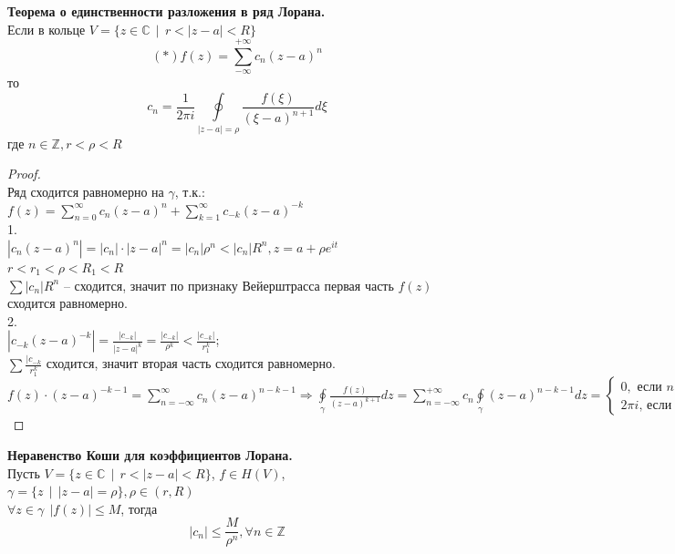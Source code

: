 \textbf{Теорема о единственности разложения в ряд Лорана.}\\[2mm]
Если в кольце $V = \{z\in\mathbb{C} ~~|~~ r < |z - a| < R\}$
$$
(*) f(z) = \sum\limits_{-\infty}^{+\infty}c_n(z - a)^n
$$
то
$$
c_n = \frac{1}{2\pi i}\oint\limits_{|z - a| = \rho} \frac{f(\xi)}{(\xi - a)^{n + 1}} d\xi
$$
где $n\in\mathbb{Z}, r < \rho < R$

\begin{proof}
    \ \\
    Ряд сходится равномерно на $\gamma$, т.к.:\\
    $f(z)=\sum_{n=0}^\infty c_n(z-a)^n + \sum_{k=1}^\infty c_{-k}(z-a)^{-k}$\\
    1.\\
    $|c_n(z-a)^n|=|c_n|\cdot|z-a|^n=|c_n|\rho^n < |c_n|R^n, z=a+\rho e^{it}$\\
    $r<r_1<\rho<R_1<R$\\
    $\sum|c_n|R^n$ -- сходится, значит по признаку Вейерштрасса первая часть  $f(z)$ сходится равномерно.\\
    2.\\
    $|c_{-k}(z-a)^{-k}|=\frac{|c_{-k}|}{|z-a|^k}=\frac{|c_{-k}|}{\rho^k}<\frac{|c_{-k}|}{r_1^k}$;\\
    $\sum \frac{|c_{-k}}{r_1^k}$ сходится, значит вторая часть сходится равномерно.\\[2mm]
    $f(z)\cdot (z-a)^{-k-1}=\sum_{n=-\infty}^\infty c_n(z-a)^{n-k-1}\Rightarrow \oint\limits_{\gamma}\frac{f(z)}{(z-a)^{k+1}}dz=\sum_{n=-\infty}^{+\infty}c_n\oint\limits_{\gamma}(z-a)^{n-k-1}dz = 
    \begin{cases}
        0,\text{ если }n-k\neq 0\\
        2\pi i\text{, если }n-k=0
    \end{cases}
    =c_k \cdot 2\pi i$

\end{proof}

\textbf{Неравенство Коши для коэффициентов Лорана.}\\[2mm]
Пусть $V = \{z\in\mathbb{C} ~~|~~ r < |z - a| < R\}$, $f\in H(V)$, \\$\gamma = \{z ~~ | ~~ |z - a| = \rho\}, \rho\in(r,R)$\\
$\forall z\in\gamma~~ |f(z)|\le M$, тогда
$$
|c_n| \le \frac{M}{\rho^n}, \forall n\in\mathbb{Z}
$$
